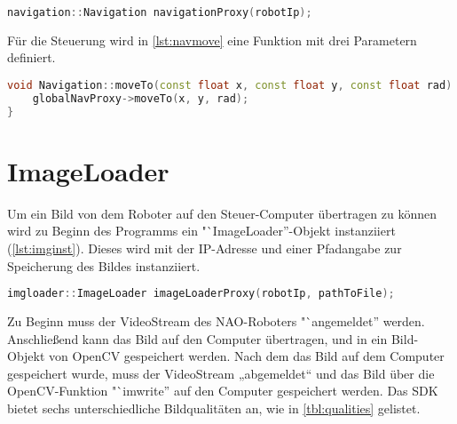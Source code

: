 \begin{lstlisting}[language=c++,
                   caption={Navigation Instanziierung},
                   label={lst:navinst}]
navigation::Navigation navigationProxy(robotIp);
\end{lstlisting}

        Für die Steuerung wird in \autoref{lst:navmove} eine Funktion mit drei
        Parametern definiert.

\begin{lstlisting}[language=c++,
                   caption={Funktion: "`moveTo''},
                   label={lst:navmove}]
void Navigation::moveTo(const float x, const float y, const float rad) {
    globalNavProxy->moveTo(x, y, rad);
}
\end{lstlisting}

    \section{ImageLoader}

        Um ein Bild von dem Roboter auf den Steuer-Computer übertragen zu können
        wird zu Beginn des Programms ein "`ImageLoader''-Objekt instanziiert
        (\autoref{lst:imginst}).
        Dieses wird mit der \ac{IP}-Adresse und einer Pfadangabe zur Speicherung
        des Bildes instanziiert.

\begin{lstlisting}[language=c++,
                   caption={ImageLoader Instanziierung},
                   label={lst:imginst}]
imgloader::ImageLoader imageLoaderProxy(robotIp, pathToFile);
\end{lstlisting}

        Zu Beginn muss der VideoStream des NAO-Roboters "`angemeldet'' werden.
        Anschließend kann das Bild auf den Computer übertragen, und in ein
        Bild-Objekt von OpenCV gespeichert werden.
        Nach dem das Bild auf dem Computer gespeichert wurde, muss der
        VideoStream „abgemeldet“ und das Bild über die OpenCV-Funktion
        "`imwrite'' auf den Computer gespeichert werden.
        Das SDK bietet sechs unterschiedliche Bildqualitäten an, wie in
        \autoref{tbl:qualities} gelistet.


